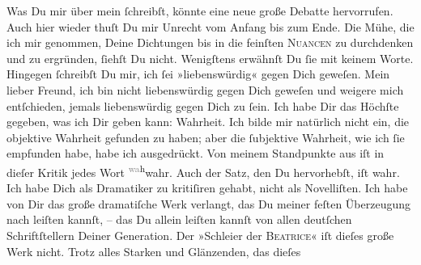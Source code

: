 \pstart
           Was Du mir über  mein \label{K_L03195-1v}\label{K_L03195-1} ſchreibſt, könnte eine neue große Debatte
               hervorrufen. Auch hier wieder thuſt Du mir {\pb}Unrecht
               vom Anfang bis zum Ende. Die Mühe, die ich mir genommen, Deine Dichtungen bis in die feinſten \textsc{Nuancen} zu durchdenken und zu ergründen, ſiehſt Du nicht.
               Wenigſtens erwähnſt Du ſie mit keinem Worte. Hingegen ſchreibſt Du mir, ich ſei
               »liebenswürdig« gegen Dich geweſen. Mein lieber Freund, ich bin nicht liebenswürdig
               gegen Dich geweſen\strikeout{,} und weigere mich entſchieden,
               jemals liebenswürdig gegen Dich zu ſein. Ich habe Dir das Höchſte \strikeout{\textcolor{gray}{in}} gegeben, was ich Dir geben kann: Wahrheit. Ich bilde mir natürlich nicht ein,
               die objektive Wahrheit gefunden zu haben; aber die ſubjektive Wahrheit, wie ich ſie
               empfunden habe, habe ich ausgedrückt. Von meinem Standpunkte aus iſt in dieſer Kritik jedes Wort \substVorne{}\textsuperscript{\textcolor{gray}{wa}h}\substDazwischen{}wahr\substHinten{}. Auch der Satz, den Du hervorhebſt, iſt wahr. Ich habe Dich als {\pb}Dramatiker zu kritiſiren gehabt, nicht als
               Novelliſten. Ich habe von Dir das große dramatiſche Werk verlangt, das Du meiner
               feſten Überzeugung nach leiſten kannſt, – das Du allein leiſten kannſt von allen
               deutſchen Schriftſtellern Deiner Generation. Der »Schleier der \textsc{Beatrice}« iſt dieſes große Werk nicht. Trotz alles Starken und Glänzenden, das dieſes
